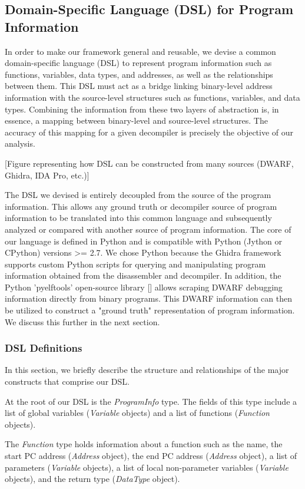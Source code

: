 \documentclass[conference]{IEEEtran}
\begin{document}
\subsection{Domain-Specific Language (DSL) for Program Information}

In order to make our framework general and reusable, we devise a common domain-specific language (DSL) to represent program information such as functions, variables, data types, and addresses, as well as the relationships between them. This DSL must act as a bridge linking binary-level address information with the source-level structures such as functions, variables, and data types. Combining the information from these two layers of abstraction is, in essence, a mapping between binary-level and source-level structures. The accuracy of this mapping for a given decompiler is precisely the objective of our analysis.

[Figure representing how DSL can be constructed from many sources (DWARF, Ghidra, IDA Pro, etc.)]

The DSL we devised is entirely decoupled from the source of the program information. This allows any ground truth or decompiler source of program information to be translated into this common language and subsequently analyzed or compared with another source of program information. The core of our language is defined in Python and is compatible with Python (Jython or CPython) versions >= 2.7. We chose Python because the Ghidra framework supports custom Python scripts for querying and manipulating program information obtained from the disassembler and decompiler. In addition, the Python 'pyelftools' open-source library [] allows scraping DWARF debugging information directly from binary programs. This DWARF information can then be utilized to construct a "ground truth" representation of program information. We discuss this further in the next section.

\subsubsection{DSL Definitions}

In this section, we briefly describe the structure and relationships of the major constructs that comprise our DSL.

At the root of our DSL is the \emph{ProgramInfo} type. The fields of this type include a list of global variables (\emph{Variable} objects) and a list of functions (\emph{Function} objects).

The \emph{Function} type holds information about a function such as the name, the start PC address (\emph{Address} object), the end PC address (\emph{Address} object), a list of parameters (\emph{Variable} objects), a list of local non-parameter variables (\emph{Variable} objects), and the return type (\emph{DataType} object).
\end{document}
